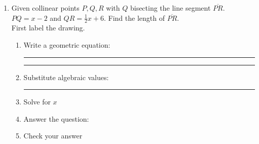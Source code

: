 \documentclass[12pt, oneside]{article}
\begin{document}
\begin{enumerate}
    \item Given collinear points $P, Q, R$ with $Q$ bisecting the line segment $\overline{PR}$. $PQ=x-2$ and $QR = \frac{1}{2} x+6$. Find the length of $\overline{PR}$.\\ \bigskip
    First label the drawing.
    \begin{flushright}
    \end{flushright}
    \vspace{1cm}
    \begin{enumerate}
      \item Write a geometric equation: \rule{4cm}{0.15mm} \hspace{1cm} \rule{4cm}{0.15mm}
      \vspace{.7cm}
      \item Substitute algebraic values: \rule{4cm}{0.15mm}
      \item Solve for $x$
      \vspace{4.5cm}
      \item Answer the question:
      \vspace{2.5cm}
      \item Check your answer
    \end{enumerate}

  \end{enumerate}

\newpage
\end{document}
